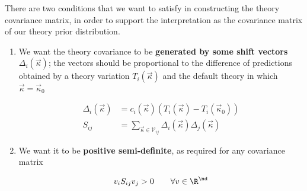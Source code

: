 There are two conditions that we want to satisfy in constructing the theory
covariance matrix, in order to support the interpretation as the covariance
matrix of our theory prior distribution.

\begin{enumerate}[label=\Alph*.]
    \item We want the theory covariance to be \textbf{generated by some shift
        vectors} $\Delta_i(\vec{\kappa})$; the vectors should be proportional
        to the difference of predictions obtained by a theory variation
        $T_i(\vec{\kappa})$ and the default theory in which $\vec{\kappa} =
        \vec{\kappa}_0$

        \begin{align}
            \Delta_i(\vec{\kappa}) &= c_i(\vec{\kappa}) \left(T_i(\vec{\kappa}) - T_i(\vec{\kappa}_0)\right)
            \label{eq:shifts}\\
            S_{ij} &= \sum_{\vec{\kappa} \in \mathcal{V}_{ij}} \Delta_i(\vec{\kappa})\Delta_j(\vec{\kappa})
            \label{eq:thcovmat}
        \end{align}
    \item We want it to be \textbf{positive semi-definite}, as required for any
        covariance matrix

        \begin{equation}
            \label{eq:pos}
            v_i S_{ij} v_j > 0 \qquad \forall v \in \R^{\nd} 
        \end{equation}
\end{enumerate}
